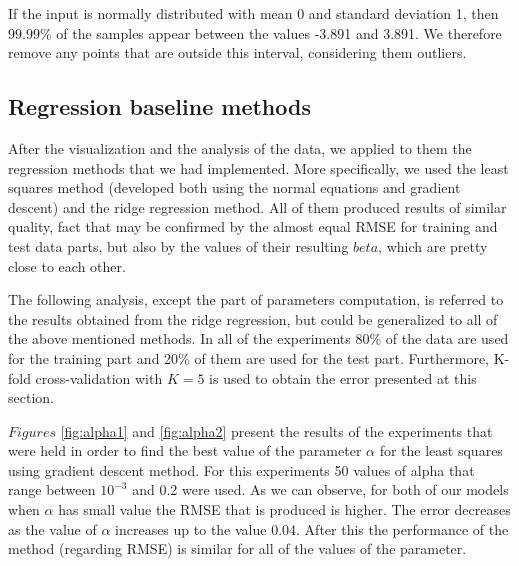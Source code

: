 If the input is normally distributed with mean 0 and standard deviation 1, then
 $99.99\%$ of the samples appear between the values -3.891 and 3.891. We therefore remove any points that are outside this interval, considering them outliers.

\subsection{Regression baseline methods}
After the visualization and the analysis of the data, we applied to them the regression methods that we had implemented. More specifically, we used the least squares method (developed both using the normal equations and gradient descent) and the ridge regression method. All of them produced results of similar quality, fact that may be confirmed by the almost equal RMSE for training and test data parts, but also by the values of their resulting $beta$, which are pretty close to each other.

The following analysis, except the part of parameters computation, is referred to the results obtained from the ridge regression, but could be generalized to all of the above mentioned methods. In all of the experiments 80\% of the data are used for the training part and 20\% of them are used for the test part. Furthermore, K-fold cross-validation  with $K=5$ is used to obtain the error presented at this section.

$Figures$ \ref{fig:alpha1} and \ref{fig:alpha2} present the results of the experiments that were held in order to find the best value of the parameter $\alpha$ for the least squares using gradient descent method. For this experiments 50 values of alpha that range between $10^{-3}$ and 0.2 were used. As we can observe, for both of our models when $\alpha$ has small value the RMSE that is produced is higher. The error decreases as the value of $\alpha$ increases up to the value 0.04. After this the performance of the method (regarding RMSE) is similar for all of the values of the parameter.

